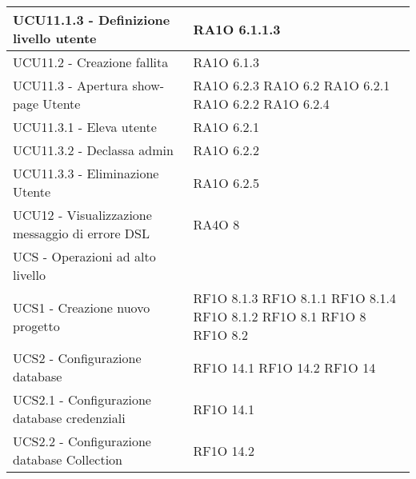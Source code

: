 \begin{center}
\begin{longtable}{ | p{5cm} | p{5cm} |}
            UCU11.1.3 - Definizione livello utente &  RA1O 6.1.1.3  \newline  \\ \hline      
            UCU11.2 - Creazione fallita &  RA1O 6.1.3  \newline  \\ \hline      
            UCU11.3 - Apertura show-page Utente &  RA1O 6.2.3 \newline  RA1O 6.2  \newline  RA1O 6.2.1 \newline  RA1O 6.2.2 \newline  RA1O 6.2.4 \newline  \\ \hline      
            UCU11.3.1 - Eleva utente &  RA1O 6.2.1 \newline  \\ \hline      
            UCU11.3.2 - Declassa admin &  RA1O 6.2.2 \newline  \\ \hline      
            UCU11.3.3 - Eliminazione Utente &  RA1O 6.2.5 \newline  \\ \hline      
            UCU12 - Visualizzazione messaggio di errore DSL &  RA4O 8 \newline  \\ \hline      
            UCS - Operazioni ad alto livello &  \\ \hline      
            UCS1 - Creazione nuovo progetto &  RF1O 8.1.3  \newline  RF1O 8.1.1  \newline  RF1O 8.1.4  \newline  RF1O 8.1.2 \newline  RF1O 8.1  \newline  RF1O 8  \newline  RF1O 8.2  \newline  \\ \hline      
            UCS2 - Configurazione database &  RF1O 14.1 \newline  RF1O 14.2 \newline  RF1O 14 \newline  \\ \hline      
            UCS2.1 - Configurazione database credenziali &  RF1O 14.1 \newline  \\ \hline      
            UCS2.2 - Configurazione database Collection &  RF1O 14.2 \newline  \\ \hline      

\end{longtable}
\end{center}
